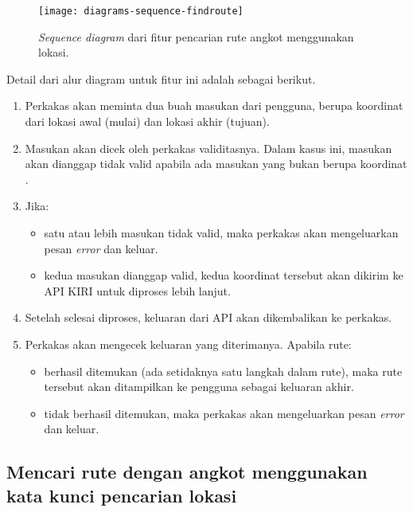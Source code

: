 \begin{figure}[ht]
    \centering
    \texttt{[image: diagrams-sequence-findroute]}
    \caption[Diagram \textit{use case} perkakas yang akan dibangun]{\textit{Sequence diagram} dari fitur pencarian rute angkot menggunakan \latlon lokasi.}
    \label{fig:diagrams-sequence-direct}
\end{figure}

Detail dari alur diagram untuk fitur ini adalah sebagai berikut.

\begin{enumerate}
	\item Perkakas akan meminta dua buah masukan dari pengguna, berupa koordinat \latlon dari lokasi awal (mulai) dan lokasi akhir (tujuan).
	\item Masukan akan dicek oleh perkakas validitasnya. Dalam kasus ini, masukan akan dianggap tidak valid apabila ada masukan yang bukan berupa koordinat \latlon .
	\item Jika:
	
	\begin{itemize}
		\item satu atau lebih masukan tidak valid, maka perkakas akan mengeluarkan pesan \textit{error} dan keluar.
		\item kedua masukan dianggap valid, kedua koordinat tersebut akan dikirim ke API KIRI untuk diproses lebih lanjut.
	\end{itemize}
	 
	\item Setelah selesai diproses, keluaran dari API akan dikembalikan ke perkakas.
	\item Perkakas akan mengecek keluaran yang diterimanya. Apabila rute:
	
	\begin{itemize}
		\item berhasil ditemukan (ada setidaknya satu langkah dalam rute), maka rute tersebut akan ditampilkan ke pengguna sebagai keluaran akhir.
		\item tidak berhasil ditemukan, maka perkakas akan mengeluarkan pesan \textit{error} dan keluar.
	\end{itemize}
	
\end{enumerate}

\subsection{Mencari rute dengan angkot menggunakan kata kunci pencarian lokasi}
\label{sec:design-diagrams-direct}

